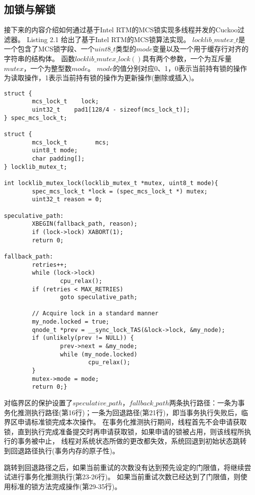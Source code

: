 \subsection{加锁与解锁}
接下来的内容介绍如何通过基于Intel RTM的MCS锁实现多线程并发的Cuckoo过滤器。
Listing 2.1 给出了基于Intel RTM的MCS锁算法实现。
$locklib\_mutex\_t$是一个包含了MCS锁字段、一个$uint8\_t$类型的$mode$变量以及一个用于缓存行对齐的字符串的结构体。
函数$locklib\_mutex\_lock()$具有两个参数，一个为互斥量$mutex$，一个为整型数$mode$。
$mode$的值分别对应0、1，0表示当前持有锁的操作为读取操作，1表示当前持有锁的操作为更新操作(删除或插入)。
\begin{lstlisting}[caption = {基于Intel RTM的MCS锁算法}]
struct {
        mcs_lock_t    lock;
        uint32_t    pad1[128/4 - sizeof(mcs_lock_t)];
} spec_mcs_lock_t;

struct {
        mcs_lock_t        mcs;
        uint8_t mode;
        char padding[];
} locklib_mutex_t;

int locklib_mutex_lock(locklib_mutex_t *mutex, uint8_t mode){
        spec_mcs_lock_t *lock = (spec_mcs_lock_t *) mutex;
        uint32_t reason = 0;

speculative_path:
        XBEGIN(fallback_path, reason);
        if (lock->lock) XABORT(1);
        return 0;

fallback_path:
        retries++;
        while (lock->lock)
                cpu_relax();
        if (retries < MAX_RETRIES)
                goto speculative_path;

        // Acquire lock in a standard manner
        my_node.locked = true;
        qnode_t *prev = __sync_lock_TAS(&lock->lock, &my_node);
        if (unlikely(prev != NULL)) {
                prev->next = &my_node;
                while (my_node.locked)
                        cpu_relax();
        }
        mutex->mode = mode;
        return 0;}
\end{lstlisting}
对临界区的保护设置了$speculative\_path$，$fallback\_path$两条执行路径：一条为事务化推测执行路径(第16行)；一条为回退路径(第21行)，即当事务执行失败后，临界区申请标准锁完成本次操作。
在事务化推测执行期间，线程首先不会申请获取锁，直到执行完成准备提交时再申请获取锁，如果申请的锁被占用，则该线程所执行的事务被中止，
线程对系统状态所做的更改都失效，系统回退到初始状态跳转到回退路径执行(事务内存的原子性)。

跳转到回退路径之后，如果当前重试的次数没有达到预先设定的门限值，将继续尝试进行事务化推测执行(第23-26行)。
如果当前重试次数已经达到了门限值，则使用标准的锁方法完成操作(第29-35行)。

